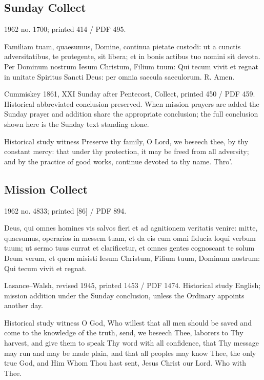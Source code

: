 \subsection{Sunday Collect}
\label{proper-collect}

1962 no. 1700; printed 414 / PDF 495.

\begin{latinproper}
Familiam tuam, quaesumus, Domine, continua pietate custodi: ut a cunctis adversitatibus, te protegente, sit libera; et in bonis actibus tuo nomini sit devota. Per Dominum nostrum Iesum Christum, Filium tuum: Qui tecum vivit et regnat in unitate Spiritus Sancti Deus: per omnia saecula saeculorum. R. Amen.
\end{latinproper}

Cummiskey 1861, XXI Sunday after Pentecost, Collect, printed 450 / PDF 459. Historical abbreviated conclusion preserved. When mission prayers are added the Sunday prayer and addition share the appropriate conclusion; the full conclusion shown here is the Sunday text standing alone.

\begin{englishwitness}{Historical study witness}
Preserve thy family, O Lord, we beseech thee, by thy constant mercy: that under thy protection, it may be freed from all adversity; and by the practice of good works, continue devoted to thy name. Thro’.
\end{englishwitness}

\subsection{Mission Collect}
\label{proper-mission-collect}

1962 no. 4833; printed [86] / PDF 894.

\begin{latinproper}
Deus, qui omnes homines vis salvos fieri et ad agnitionem veritatis venire: mitte, quaesumus, operarios in messem tuam, et da eis cum omni fiducia loqui verbum tuum; ut sermo tuus currat et clarificetur, et omnes gentes cognoscant te solum Deum verum, et quem misisti Iesum Christum, Filium tuum, Dominum nostrum: Qui tecum vivit et regnat.
\end{latinproper}

Lasance–Walsh, revised 1945, printed 1453 / PDF 1474. Historical study English; mission addition under the Sunday conclusion, unless the Ordinary appoints another day.

\begin{englishwitness}{Historical study witness}
O God, Who willest that all men should be saved and come to the knowledge of the truth, send, we beseech Thee, laborers to Thy harvest, and give them to speak Thy word with all confidence, that Thy message may run and may be made plain, and that all peoples may know Thee, the only true God, and Him Whom Thou hast sent, Jesus Christ our Lord. Who with Thee.
\end{englishwitness}

